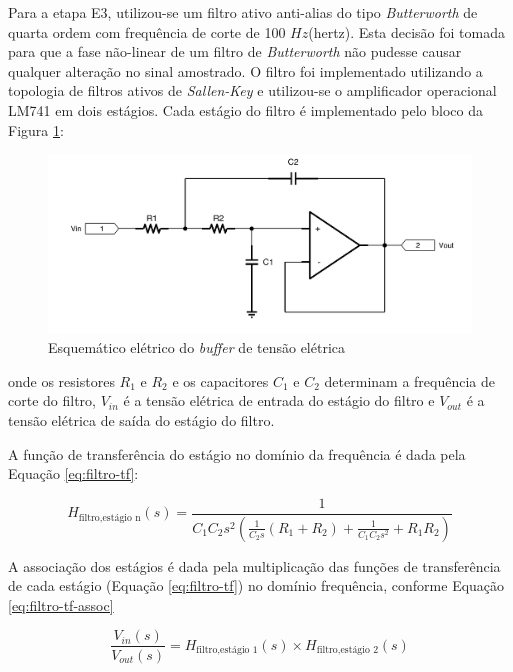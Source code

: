 \documentclass[a4paper]{instrumentacao}
\begin{document}
Para a etapa E3, utilizou-se um filtro ativo anti-alias do tipo \textit{Butterworth} de quarta ordem com frequência de corte de 100 $Hz$(hertz). Esta decisão foi tomada para que a fase não-linear de um filtro de \textit{Butterworth} não pudesse causar qualquer alteração no sinal amostrado. O filtro foi implementado utilizando a topologia de filtros ativos de \textit{Sallen-Key} e utilizou-se o amplificador operacional LM741 em dois estágios. Cada estágio do filtro é implementado pelo bloco da Figura \ref{fig:filtro-estagio}:

\begin{figure}[H]
\centering
\includegraphics[width=\textwidth]{Filtro-estagio.pdf}
\caption{Esquemático elétrico do \textit{buffer} de tensão elétrica}
\label{fig:filtro-estagio}
\end{figure}

\noindent
onde os resistores $R_1$ e $R_2$ e os capacitores $C_1$ e $C_2$ determinam a frequência de corte do filtro, $V_{in}$ é a tensão elétrica de entrada do estágio do filtro e $V_{out}$ é a tensão elétrica de saída do estágio do filtro.

A função de transferência do estágio no domínio da frequência é dada pela Equação \ref{eq:filtro-tf}:

\begin{equation}
	H_{\text{filtro}, \text{estágio n}}(s) = \frac{1}{C_1 C_2 s^2 \left(\frac{1}{C_2 s}\left(R_1+R_2\right)+\frac{1}{C_1 C_2 s^2}+R_1 R_2\right)}
	\label{eq:filtro-tf}
\end{equation}

A associação dos estágios é dada pela multiplicação das funções de transferência de cada estágio (Equação \ref{eq:filtro-tf}) no domínio frequência, conforme Equação \ref{eq:filtro-tf-assoc}

\begin{equation}
	\frac{V_{in}(s)}{V_{out}(s)} = H_{\text{filtro}, \text{estágio 1}}(s) \times H_{\text{filtro}, \text{estágio 2}}(s)
	\label{eq:filtro-tf-assoc}
\end{equation}
\end{document}
